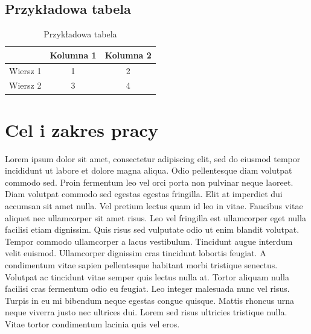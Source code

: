 \documentclass[a4paper,12pt,titlepage]{report}
\begin{document}
\section{Przykładowa tabela}
\begin{table}[h]
\centering
\caption{Przykładowa tabela}
\label{tab:Intro:PrzykladowaTabela}
\begin{tabular}{c|c|c}
         & \textbf{Kolumna 1} & \textbf{Kolumna 2} \\ \hline
Wiersz 1 & 1                  & 2                  \\
Wiersz 2 & 3                  & 4                 
\end{tabular}
\end{table}

\chapter{Cel i zakres pracy}
Lorem ipsum dolor sit amet, consectetur adipiscing elit, sed do eiusmod tempor incididunt ut labore et dolore magna aliqua. Odio pellentesque diam volutpat commodo sed. Proin fermentum leo vel orci porta non pulvinar neque laoreet. Diam volutpat commodo sed egestas egestas fringilla. Elit at imperdiet dui accumsan sit amet nulla. Vel pretium lectus quam id leo in vitae. Faucibus vitae aliquet nec ullamcorper sit amet risus. Leo vel fringilla est ullamcorper eget nulla facilisi etiam dignissim. Quis risus sed vulputate odio ut enim blandit volutpat. Tempor commodo ullamcorper a lacus vestibulum. Tincidunt augue interdum velit euismod. Ullamcorper dignissim cras tincidunt lobortis feugiat. A condimentum vitae sapien pellentesque habitant morbi tristique senectus. Volutpat ac tincidunt vitae semper quis lectus nulla at. Tortor aliquam nulla facilisi cras fermentum odio eu feugiat. Leo integer malesuada nunc vel risus. Turpis in eu mi bibendum neque egestas congue quisque. Mattis rhoncus urna neque viverra justo nec ultrices dui. Lorem sed risus ultricies tristique nulla. Vitae tortor condimentum lacinia quis vel eros.
\end{document}
